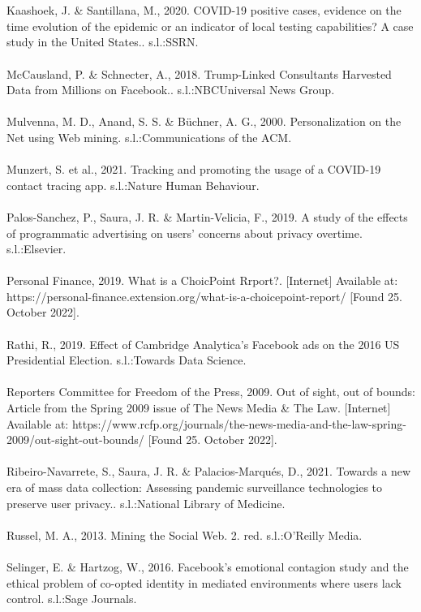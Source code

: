 \documentclass[11pt]{article}
\begin{document}
\\ \\
Kaashoek, J. \& Santillana, M., 2020. COVID-19 positive cases, evidence on the time evolution of the epidemic or an indicator of local testing capabilities? A case study in the United States.. s.l.:SSRN.
\\ \\
McCausland, P. \& Schnecter, A., 2018. Trump-Linked Consultants Harvested Data from Millions on Facebook.. s.l.:NBCUniversal News Group.
\\ \\
Mulvenna, M. D., Anand, S. S. \& Büchner, A. G., 2000. Personalization on the Net using Web mining. s.l.:Communications of the ACM.
\\ \\
Munzert, S. et al., 2021. Tracking and promoting the usage of a COVID-19 contact tracing app. s.l.:Nature Human Behaviour.
\\ \\
Palos-Sanchez, P., Saura, J. R. \& Martin-Velicia, F., 2019. A study of the effects of programmatic advertising on users' concerns about privacy overtime. s.l.:Elsevier.
\\ \\
Personal Finance, 2019. What is a ChoicPoint Rrport?. [Internet] 
Available at: https://personal-finance.extension.org/what-is-a-choicepoint-report/
[Found 25. October 2022].
\\ \\
Rathi, R., 2019. Effect of Cambridge Analytica’s Facebook ads on the 2016 US Presidential Election. s.l.:Towards Data Science.
\\ \\
Reporters Committee for Freedom of the Press, 2009. Out of sight, out of bounds: Article from the Spring 2009 issue of The News Media \& The Law. [Internet] 
Available at: https://www.rcfp.org/journals/the-news-media-and-the-law-spring-2009/out-sight-out-bounds/
[Found 25. October 2022].
\\ \\
Ribeiro-Navarrete, S., Saura, J. R. \& Palacios-Marqués, D., 2021. Towards a new era of mass data collection: Assessing pandemic surveillance technologies to preserve user privacy.. s.l.:National Library of Medicine.
\\ \\
Russel, M. A., 2013. Mining the Social Web. 2. red. s.l.:O'Reilly Media.
\\ \\
Selinger, E. \& Hartzog, W., 2016. Facebook’s emotional contagion study and the ethical problem of co-opted identity in mediated environments where users lack control. s.l.:Sage Journals.
\end{document}
